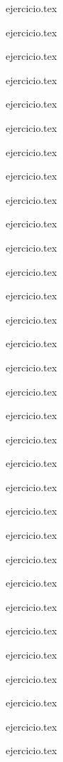 \begin{enumerate}
    \begin{minipage}{0.45\textwidth}
    {ejercicio.tex}
    \addtocounter{enumi}{1}
    {ejercicio.tex}
    \addtocounter{enumi}{1}
    {ejercicio.tex}
    \addtocounter{enumi}{1}
    {ejercicio.tex}
    \addtocounter{enumi}{1}
    {ejercicio.tex}
    \addtocounter{enumi}{1}
    {ejercicio.tex}
    \addtocounter{enumi}{1}
    {ejercicio.tex}
    \addtocounter{enumi}{1}
    {ejercicio.tex}
    \addtocounter{enumi}{1}
    {ejercicio.tex}
    \addtocounter{enumi}{1}
    {ejercicio.tex}
    \addtocounter{enumi}{1}
    {ejercicio.tex}
    \addtocounter{enumi}{1}
    {ejercicio.tex}
    \addtocounter{enumi}{1}
    {ejercicio.tex}
    \addtocounter{enumi}{1}
    {ejercicio.tex}
    \addtocounter{enumi}{1}
    {ejercicio.tex}
    \addtocounter{enumi}{1}
    {ejercicio.tex}
    \addtocounter{enumi}{1}
    {ejercicio.tex}
    \addtocounter{enumi}{1}
    {ejercicio.tex}
    \addtocounter{enumi}{1}
    {ejercicio.tex}
    \addtocounter{enumi}{1}
    {ejercicio.tex}
    \addtocounter{enumi}{1}
    {ejercicio.tex}
    \addtocounter{enumi}{1}
    {ejercicio.tex}
    \end{minipage}%
    \begin{minipage}{0.45\textwidth}
    \setcounter{enumi}{1}
    {ejercicio.tex}
    \addtocounter{enumi}{1}
    {ejercicio.tex}
    \addtocounter{enumi}{1}
    {ejercicio.tex}
    \addtocounter{enumi}{1}
    {ejercicio.tex}
    \addtocounter{enumi}{1}
    {ejercicio.tex}
    \addtocounter{enumi}{1}
    {ejercicio.tex}
    \addtocounter{enumi}{1}
    {ejercicio.tex}
    \addtocounter{enumi}{1}
    {ejercicio.tex}
    \addtocounter{enumi}{1}
    {ejercicio.tex}
    \addtocounter{enumi}{1}
    {ejercicio.tex}
    \addtocounter{enumi}{1}

\end{minipage}
\end{enumerate}
